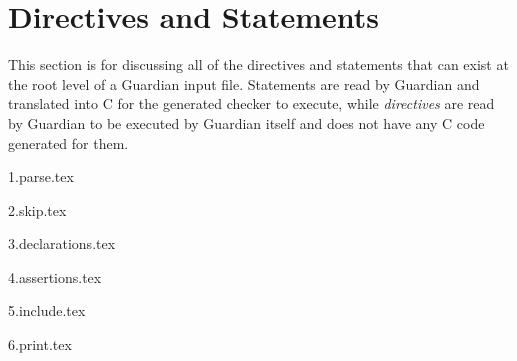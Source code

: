 
\section{Directives and Statements}
{
	This section is for discussing all of the
	directives and statements that can
	exist at the root level of a Guardian input file.
	Statements are read by Guardian and translated into C
	for the generated checker to
	execute, while \textit{directives} are read by Guardian to be
	executed by Guardian itself
	and does not have any C code generated for them.
	
	{1.parse.tex}
	
	{2.skip.tex}
	
	{3.declarations.tex}
	
	{4.assertions.tex}
	
	{5.include.tex}
	
	{6.print.tex}
}


